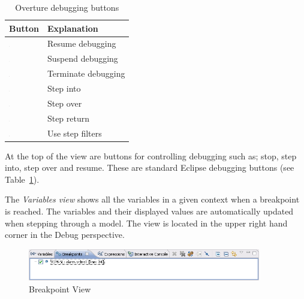 \begin{table}
\begin{center}
\begin{tabular}{|l|l|}\hline \hline
\textbf{Button} & \textbf{Explanation} \\ \hline
\includegraphics[width=0.03\textwidth]{figures/resume} & Resume debugging \\
\includegraphics[width=0.03\textwidth]{figures/suspend} & Suspend debugging\\
\includegraphics[width=0.03\textwidth]{figures/terminate} & Terminate debugging\\
\includegraphics[width=0.03\textwidth]{figures/stepinto} & Step into\\
\includegraphics[width=0.03\textwidth]{figures/stepover} & Step over \\
\includegraphics[width=0.03\textwidth]{figures/stepreturn} & Step return\\
\includegraphics[width=0.03\textwidth]{figures/stepbystep} & Use step filters\\
\hline \hline
\end{tabular}
\caption{Overture debugging buttons\label{tab:debugButtons}}
\end{center}
\end{table}
%
At the top of the view are buttons for controlling debugging such as; stop, step into, step over and resume. These are standard Eclipse debugging buttons (see Table~\ref{tab:debugButtons}).

The \emph{Variables view} shows all the variables in a given context when a breakpoint is reached. The variables and their displayed values are automatically updated when stepping through a model. The view is
located in the upper right hand corner in the Debug perspective.
%
\begin{figure}[htp]
\begin{center}
  \caption{Breakpoint View}
  \label{fig:BreakpointView}
  \includegraphics[width=4in]{figures/BreakpointView}
\end{center}
\end{figure}
%
